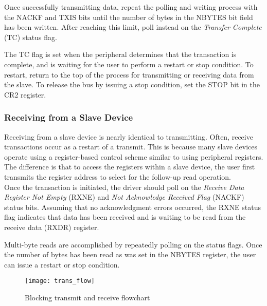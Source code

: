 \documentclass[11pt,fleqn]{book} %
\begin{document}
        Once successfully transmitting data, repeat the polling and writing process with the NACKF and TXIS bits until the number of bytes in the NBYTES bit field has been written. After reaching this limit, poll instead on the \textit{Transfer Complete} (TC) status flag. 
        
        The TC flag is set when the peripheral determines that the transaction is complete, and is waiting for the user to perform a restart or stop condition. To restart, return to the top of the process for transmitting or receiving data from the slave. To release the bus by issuing a stop condition, set the STOP bit in the CR2 register.  
    
    \subsubsection{Receiving from a Slave Device}
        Receiving from a slave device is nearly identical to transmitting. Often, receive transactions occur as a restart of a transmit. This is because many slave devices operate using a register-based control scheme similar to using peripheral registers. The difference is that to access the registers within a slave device, the user first transmits the register address to select for the follow-up read operation. \\
        
        Once the transaction is initiated, the driver should poll on the \textit{Receive Data Register Not Empty} (RXNE) and \textit{Not Acknowledge Received Flag} (NACKF) status bits. Assuming that no acknowledgment errors occurred, the RXNE status flag indicates that data has been received and is waiting to be read from the receive data (RXDR) register.  
        
        Multi-byte reads are accomplished by repeatedly polling on the status flags. Once the number of bytes has been read as was set in the NBYTES register, the user can issue a restart or stop condition.  
    
    \begin{figure}[]
       \centering\texttt{[image: trans\_flow]}
       \caption{Blocking transmit and receive flowchart}
       \label{trans_flow}
    \end{figure}
\end{document}
